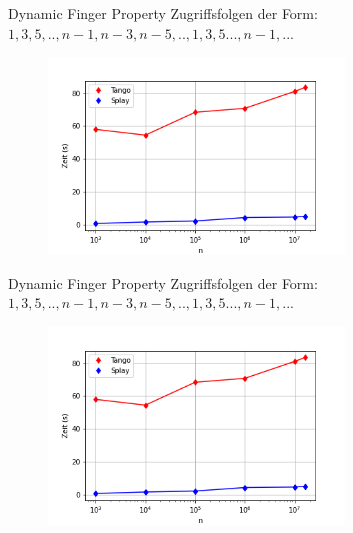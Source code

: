 \documentclass[11pt]{beamer}
\begin{document}
\begin{frame}{Dynamic Finger Property}
     Zugriffsfolgen der Form:  $1, 3, 5,..,n-1, n-3, n-5, ..,1, 3, 5..., n-1,...$ 
     
	\begin{figure}[H]
		\centering
		\includegraphics[width=0.7\textwidth]{Medien/pres/dynamicfinger}
	\end{figure}
\end{frame}
\begin{frame}{Dynamic Finger Property}
	Zugriffsfolgen der Form:  $1, 3, 5,..,n-1, n-3, n-5, ..,1, 3, 5..., n-1,...$ 
	
	\begin{figure}[H]
		\centering
		\includegraphics[width=0.7\textwidth]{Medien/pres/dynamicfinger}
	\end{figure}
\end{frame}
\end{document}
